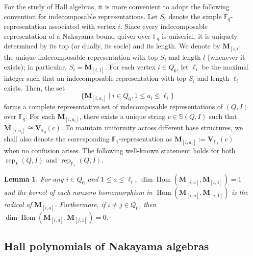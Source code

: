 \documentclass[12pt]{amsart}
\newtheorem{lemma}[theorem]{Lemma}
\theoremstyle{remark}
\theoremstyle{definition}
\numberwithin{equation}{section}
\newcommand{\Hom}{\operatorname{Hom}\nolimits}
\begin{document}
For the study of Hall algebras, it is more convenient to adopt the following convention for indecomposable representations. Let $S_i$ denote the simple $\mathbb{F}_q$-representation associated with vertex $i$. Since every indecomposable representation of a Nakayama bound quiver over $\mathbb{F}_q$ is uniserial, it is uniquely determined by its top (or dually, its socle) and its length. We denote by $\mathbf{M}_{[i,l]}$ the unique indecomposable representation with top $S_i$ and length $l$ (whenever it exists); in particular, $S_i = \mathbf{M}_{[i,1]}$. For each vertex $i \in Q_0$, let $\ell_i$ be the maximal integer such that an indecomposable representation with top $S_i$ and length $\ell_i$ exists. 
 Then, the set$$\{\mathbf{M}_{[i,a_i]} \mid i \in Q_0, 1 \leq a_i \leq \ell_i\}$$forms a complete representative set of indecomposable representations of $(Q,I)$ over $\mathbb{F}_q$. For each $\mathbf{M}_{[i,a_i]}$, there exists a unique string $c \in \mathbb{S}(Q,I)$ such that $\mathbf{M}_{[i,a_i]} \cong \mathbf{V}_{\mathbb{F}_q}(c)$. To maintain uniformity across different base structures, we shall also denote the corresponding $\mathbb{F}_1$-representation as $\mathbf{M}_{[i,a_i]} := \mathbf{V}_{\mathbb{F}_1}(c)$ when no confusion arises.
The following well-known statement holds for both $\operatorname{rep}_{k}(Q,I)$ and $\operatorname{rep}_{\mathbb{F}_1}(Q,I)$.
\begin{lemma}\label{lem:canonical-sujective-to-simple}
    For any $i\in Q_0$ and $1\leq a\leq \ell_i$, $\dim \Hom(\mathbf{M}_{[i,a]},\mathbf{M}_{[i,1]})=1$ and the kernel of each nonzero homomorphism in $\Hom(\mathbf{M}_{[i,a]},\mathbf{M}_{[i,1]})$ is the radical of $\mathbf{M}_{[i,a]}$. Furthermore, if $i\neq j\in Q_0$, then $\dim\Hom(\mathbf{M}_{[i,a]},\mathbf{M}_{[j,1]})=0$.
\end{lemma}



\subsection{Hall polynomials of Nakayama algebras}
\end{document}
